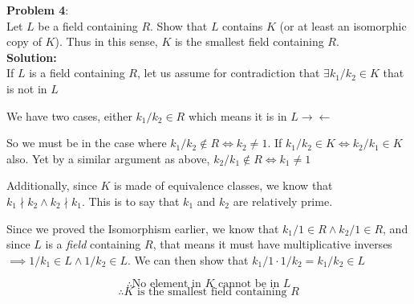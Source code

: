 \documentclass[11pt]{article}
\newcommand{\prob}[3]{\begin{flushleft}
        \textbf{Problem #1}: \\
        #2 
		\textbf{Solution:} 
		#3

\end{flushleft}}
\begin{document}
\prob{4}{
  Let $L$ be a field containing $R$. Show that $L$ contains $K$ (or at least an isomorphic copy of $K$). Thus in this sense, $K$ is
  the smallest field containing $R$. \\
}{ \\
  If $L$ is a field containing $R$, let us assume for contradiction that $\exists k_1/k_2 \in K$ that is not in $L$

  We have two cases, either $k_1/k_2 \in R$ which means it is in $L \rightarrow\leftarrow$

  So we must be in the case where $k_1/k_2 \notin R \iff k_2 \neq 1$. If $k_1/k_2 \in K \iff k_2/k_1 \in K$ also.
  Yet by a similar argument as above, $k_2/k_1 \notin R \iff k_1 \neq 1$

  Additionally, since $K$ is made of equivalence classes, we know that $k_1 \nmid  k_2 \land k_2 \nmid k_1$.
  This is to say that $k_1$ and $k_2$ are relatively prime.

  Since we proved the Isomorphism earlier, we know that $k_1/1 \in R \land k_2/1 \in R$, and since $L$ is a \emph{field} containing $R$, that means it must have multiplicative inverses $\implies 1/k_1 \in L \land 1/k_2 \in L$. We can then show that $k_1/1 \cdot 1/k_2 = k_1/k_2 \in L$

  $$\therefore \text{No element in $K$ cannot be in $L$}$$
  $$\therefore \text{$K$ is the smallest field containing $R$}$$
}
\end{document}
